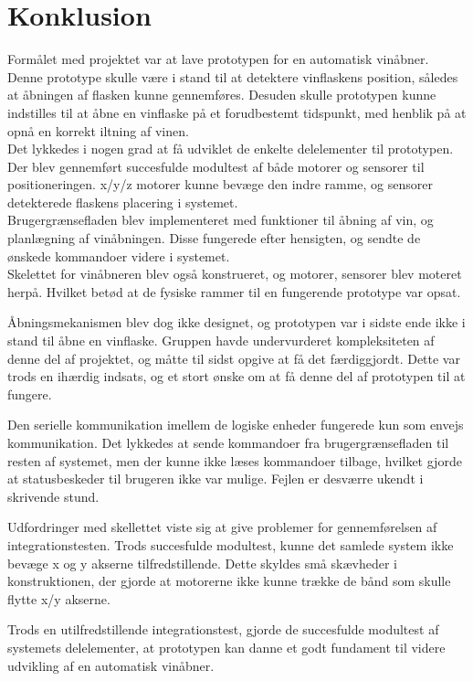 \chapter{Konklusion}
Formålet med projektet var at lave prototypen for en automatisk vinåbner. Denne prototype skulle være i stand til at detektere vinflaskens position, således at
åbningen af flasken kunne gennemføres. Desuden skulle prototypen kunne indstilles til at åbne en vinflaske på et forudbestemt tidspunkt, med henblik på at 
opnå en korrekt iltning af vinen.\\

Det lykkedes i nogen grad at få udviklet de enkelte delelementer til prototypen. Der blev gennemført succesfulde modultest af både motorer og sensorer til 
positioneringen. x/y/z motorer kunne bevæge den indre ramme, og sensorer detekterede flaskens placering i systemet.\\

Brugergrænsefladen blev implementeret med funktioner til åbning af vin, og planlægning af vinåbningen. Disse fungerede efter hensigten, og sendte de ønskede
kommandoer videre i systemet.\\

Skelettet for vinåbneren blev også konstrueret, og motorer, sensorer blev moteret herpå. Hvilket betød at de fysiske rammer til en fungerende prototype var opsat.

Åbningsmekanismen blev dog ikke designet, og prototypen var i sidste ende ikke i stand til åbne en vinflaske. Gruppen havde undervurderet kompleksiteten af denne
del af projektet, og måtte til sidst opgive at få det færdiggjordt. Dette var trods en ihærdig indsats, og et stort ønske om at få denne del af prototypen til
at fungere.

Den serielle kommunikation imellem de logiske enheder fungerede kun som envejs kommunikation. Det lykkedes at sende kommandoer fra brugergrænsefladen til
resten af systemet, men der kunne ikke læses kommandoer tilbage, hvilket gjorde at statusbeskeder til brugeren ikke var mulige. Fejlen er desværre ukendt i
skrivende stund.

Udfordringer med skellettet viste sig at give problemer for gennemførelsen af integrationstesten. Trods succesfulde modultest, kunne det samlede system ikke
bevæge x og y akserne tilfredstillende. Dette skyldes små skævheder i konstruktionen, der gjorde at motorerne ikke kunne trække de bånd som skulle flytte x/y
akserne.       

Trods en utilfredstillende integrationstest, gjorde de succesfulde modultest af systemets delelementer, at prototypen kan danne et godt fundament til videre 
udvikling af en automatisk vinåbner.